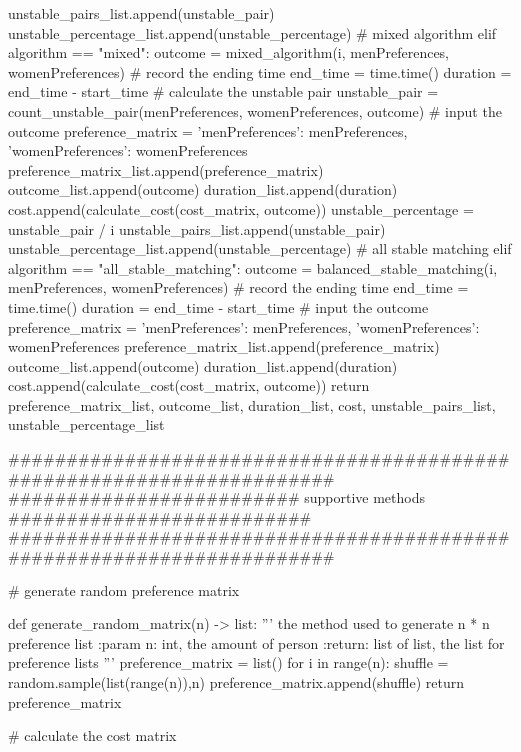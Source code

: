 \documentclass[14pt]{extarticle}
\begin{document}
\begin{python}
            unstable_pairs_list.append(unstable_pair)
            unstable_percentage_list.append(unstable_percentage)
        # mixed algorithm        
        elif algorithm == "mixed": 
            outcome = mixed_algorithm(i, menPreferences, womenPreferences)   
            # record the ending time
            end_time = time.time()
            duration = end_time - start_time
            # calculate the unstable pair
            unstable_pair = count_unstable_pair(menPreferences, womenPreferences, outcome)
            # input the outcome
            preference_matrix = {'menPreferences': menPreferences, 'womenPreferences': womenPreferences}
            preference_matrix_list.append(preference_matrix)
            outcome_list.append(outcome)
            duration_list.append(duration)
            cost.append(calculate_cost(cost_matrix, outcome))
            unstable_percentage = unstable_pair / i
            unstable_pairs_list.append(unstable_pair)
            unstable_percentage_list.append(unstable_percentage)
        # all stable matching 
        elif algorithm == "all_stable_matching":
            outcome = balanced_stable_matching(i, menPreferences, womenPreferences)   
            # record the ending time
            end_time = time.time()
            duration = end_time - start_time
            # input the outcome
            preference_matrix = {'menPreferences': menPreferences, 'womenPreferences': womenPreferences}
            preference_matrix_list.append(preference_matrix)
            outcome_list.append(outcome)
            duration_list.append(duration)
            cost.append(calculate_cost(cost_matrix, outcome))
    return preference_matrix_list, outcome_list, duration_list, cost, unstable_pairs_list, unstable_percentage_list

#######################################################################
######################### supportive methods ##########################
#######################################################################    

# generate random preference matrix

def generate_random_matrix(n) -> list:
    '''
    the method used to generate n * n preference list 
    :param n: int, the amount of person
    :return: list of list, the list for preference lists
    '''
    preference_matrix = list()
    for i in range(n):
        shuffle = random.sample(list(range(n)),n)
        preference_matrix.append(shuffle)
    return preference_matrix

# calculate the cost matrix


\end{python}
\end{document}
